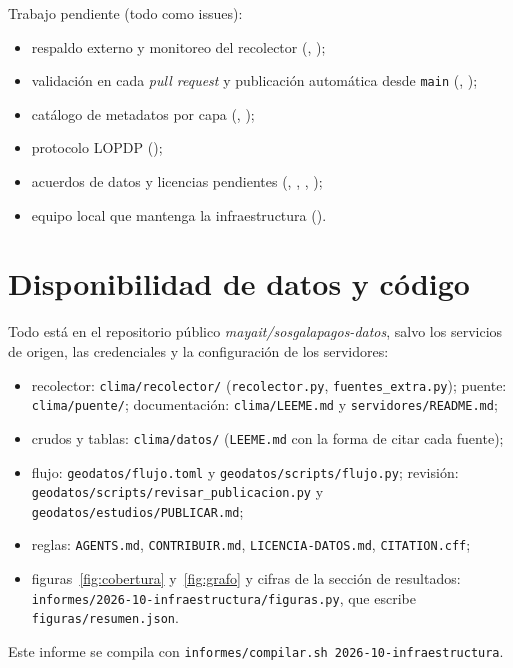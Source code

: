 \documentclass{sosg-informe}
\begin{document}
Trabajo pendiente (todo como issues):
\begin{itemize}
  \item respaldo externo y monitoreo del recolector (, );
  \item validación en cada \emph{pull request} y publicación automática desde \texttt{main} (, );
  \item catálogo de metadatos por capa (, );
  \item protocolo LOPDP ();
  \item acuerdos de datos y licencias pendientes (, , , );
  \item equipo local que mantenga la infraestructura ().
\end{itemize}

\section*{Disponibilidad de datos y código}
{\small\raggedright Todo está en el repositorio público \emph{mayait/sosgalapagos-datos}, salvo los servicios de origen, las credenciales y la configuración de los servidores:
\begin{itemize}
  \item recolector: \texttt{clima/recolector/} (\texttt{recolector.py}, \texttt{fuentes\_extra.py}); puente: \texttt{clima/puente/}; documentación: \texttt{clima/LEEME.md} y \texttt{servidores/README.md};
  \item crudos y tablas: \texttt{clima/datos/} (\texttt{LEEME.md} con la forma de citar cada fuente);
  \item flujo: \texttt{geodatos/flujo.toml} y \texttt{geodatos/scripts/flujo.py}; revisión: \texttt{geodatos/scripts/revisar\_publicacion.py} y \texttt{geodatos/estudios/PUBLICAR.md};
  \item reglas: \texttt{AGENTS.md}, \texttt{CONTRIBUIR.md}, \texttt{LICENCIA-DATOS.md}, \texttt{CITATION.cff};
  \item figuras~\ref{fig:cobertura} y~\ref{fig:grafo} y cifras de la sección de resultados: \texttt{informes/2026-10-infraestructura/figuras.py}, que escribe \texttt{figuras/resumen.json}.
\end{itemize}
Este informe se compila con \texttt{informes/compilar.sh 2026-10-infraestructura}.\par}



\end{document}
